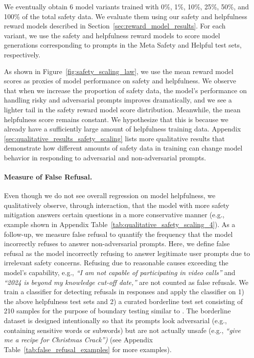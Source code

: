 We eventually obtain 6 model variants trained with 0\%, 1\%, 10\%, 25\%, 50\%, and 100\% of the total safety data. We evaluate them using our safety and helpfulness reward models described in Section~\ref{sec:reward_model_results}. For each variant, we use the safety and helpfulness reward models to score model generations corresponding to prompts in the Meta Safety and Helpful test sets, respectively.

As shown in Figure~\ref{fig:safety_scaling_law}, we use the mean reward model scores as proxies of model performance on safety and helpfulness. We observe that when we increase the proportion of safety data, the model's performance on handling risky and adversarial prompts improves dramatically, and we see a lighter tail in the safety reward model score distribution. Meanwhile, the mean helpfulness score remains constant. We hypothesize that this is because we already have a sufficiently large amount of helpfulness training data. Appendix \ref{sec:qualitative_results_safety_scaling} lists more qualitative results that demonstrate how different amounts of safety data in training can change model behavior in responding to adversarial and non-adversarial prompts.

\paragraph{Measure of False Refusal.} Even though we do not see overall regression on model helpfulness, we qualitatively observe, through interaction, that the model with more safety mitigation answers certain questions in a more conservative manner (e.g., example shown in Appendix Table~\ref{tab:qualitative_safety_scaling_4}).  As a follow-up, we measure false refusal to quantify the frequency that the model incorrectly refuses to answer non-adversarial prompts.  Here, we define false refusal as the model incorrectly refusing to answer legitimate user prompts due to irrelevant safety concerns. Refusing due to reasonable causes exceeding the model's capability, e.g., \textit{``I am not capable of participating in video calls''} and \textit{``2024 is beyond my knowledge cut-off date,''} are not counted as false refusals. We train a classifier for detecting refusals in responses and apply the classifier on 1) the above helpfulness test sets and 2) a curated borderline test set consisting of 210 samples for the purpose of boundary testing similar to \cite{openai2023gpt4}. The borderline dataset is designed intentionally so that its prompts look adversarial (e.g., containing sensitive words or subwords) but are not actually unsafe (e.g., \textit{``give me a recipe for Christmas Crack'')} (see Appendix Table~\ref{tab:false_refusal_examples} for more examples).

